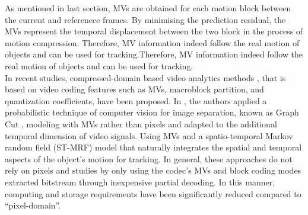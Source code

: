  As mentioned in last section, MVs are obtained for each motion block between the current and referenece frames. By minimising the prediction residual, the MVs represent the temporal displacement between the two block in the process of motion compression. Therefore, MV information indeed follow the real motion of objects and can be used for tracking.Therefore, MV information indeed follow the real motion of objects and can be used for tracking.\\
In recent studies, compressed-domain based video analytics methods  \cite{bombardelli2018efficient},\cite{khatoonabadi2012video} that is based on video coding features such as MVs, macroblock partition, and quantization coefficients, have been proposed. In \cite{bombardelli2018efficient}, the authors applied a probabilistic technique of computer vision for image separation, known as Graph Cut \cite{boykov2001fast}, modeling with MVs rather than pixels and adapted to the additional temporal dimension of video signals. Using MVs and a spatio-temporal Markov random field (ST-MRF) model that naturally integrates the spatial and temporal aspects of the object’s motion for tracking. In general, these approaches do not rely on pixels and studies by only using the codec’s MVs and block coding modes extracted bitstream through inexpensive partial decoding. In this manner, computing and storage requirements have been significantly reduced compared to “pixel-domain”.\\


